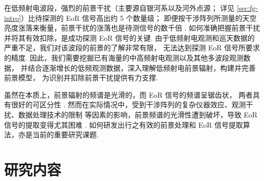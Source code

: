 在低频射电波段，强烈的前景干扰（主要源自银河系以及河外点源；
详见 \autoref{sec:fg-intro}）比待探测的 EoR 信号高出约 5 个数量级；
即便按干涉阵列所测量的天空亮度涨落来衡量，前景干扰的涨落也是待测信号的数千倍
\cite{zaroubi2013}.
如何准确把握前景干扰并将其有效扣除，是成功探测 EoR 信号的关键.
由于低频射电观测和巡天数据的严重不足，我们对该波段的前景的了解非常有限，
无法达到探测 EoR 信号所要求的精度.
因此，我们需要挖掘已有海量的中高频射电观测以及其他多波段观测数据，
并结合逐渐增长的低频观测数据，深入理解低频射电前景辐射，构建并完善前景模型，
为识别并扣除前景干扰提供有力支撑.

虽然在本质上，前景辐射的频谱是光滑的，而 EoR 信号的频谱呈锯齿状，
两者具有很好的可区分性 \cite{wang2006,jelic2008,harker2009,wang2013}.
然而在实际情况中，受到干涉阵列的复杂仪器效应、观测干扰、数据处理技术的限制
等因素的影响，前景频谱的光滑性遭到破坏，导致 EoR 信号的提取变得尤其困难
\cite{liu2009ps,labropoulos2009,gehlot2018,mertens2018}.
如何研发出行之有效的前景处理和 EoR 信号提取算法，亦是当前的重要研究课题.


\section{研究内容}
\label{sec:content}


